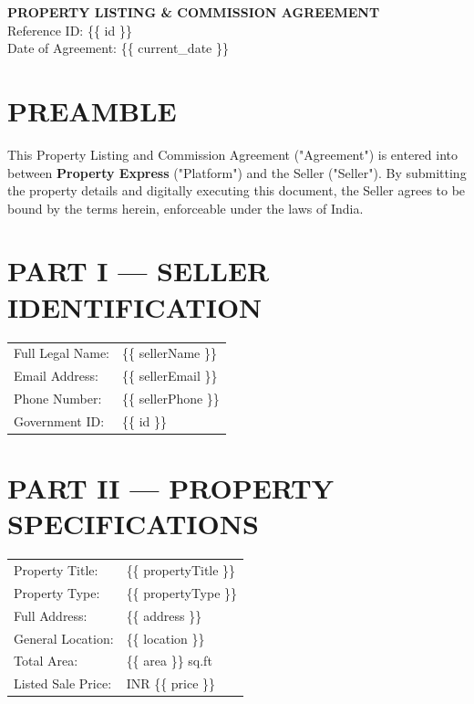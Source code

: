 \documentclass[12pt]{article}
\begin{document}
\begin{center}
    \LARGE \textbf{PROPERTY LISTING \& COMMISSION AGREEMENT} \\
    \vspace{0.8em}
    \normalsize Reference ID: \{\{ id \}\} \\
    Date of Agreement: \{\{ current\_date \}\}
\end{center}

\vspace{1.5em}

\section*{PREAMBLE}
This Property Listing and Commission Agreement ("Agreement") is entered into between \textbf{Property Express} ("Platform") and the Seller ("Seller"). By submitting the property details and digitally executing this document, the Seller agrees to be bound by the terms herein, enforceable under the laws of India.

\section*{PART I — SELLER IDENTIFICATION}
\begin{tabular}{ll}
Full Legal Name: & \{\{ sellerName \}\} \\
Email Address: & \{\{ sellerEmail \}\} \\
Phone Number: & \{\{ sellerPhone \}\} \\
Government ID: & \{\{ id \}\} \\
\end{tabular}

\vspace{1.5em}

\section*{PART II — PROPERTY SPECIFICATIONS}
\begin{tabular}{ll}
Property Title: & \{\{ propertyTitle \}\} \\
Property Type: & \{\{ propertyType \}\} \\
Full Address: & \{\{ address \}\} \\
General Location: & \{\{ location \}\} \\
Total Area: & \{\{ area \}\} sq.ft \\
Listed Sale Price: & INR \{\{ price \}\} \\
\end{tabular}
\end{document}
